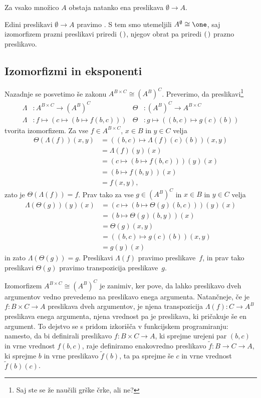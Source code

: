 \begin{trditev}
  Za vsako množico $A$ obstaja natanko ena preslikava $\emptyset \to A$.
\end{trditev}

Edini preslikavi $\emptyset \to A$ pravimo . S tem smo utemeljili
$A^\emptyset \cong \one$, saj izomorfizem prazni preslikavi priredi
$(\,)$, njegov obrat pa priredi $(\,)$ prazno preslikavo.

\subsection{Izomorfizmi in eksponenti}
\label{sec:izomorfizmi-in-eksponenti}

Nazadnje se posvetimo še zakonu $A^{B \times C} \cong (A^B)^C$.
Preverimo, da preslikavi\footnote{Saj ste se že naučili grške črke, ali ne?}
%
\begin{align*}
  \Lambda &: A^{B \times C} \to (A^B)^C
  &
  \Theta &: (A^B)^C \to A^{B \times C}
  \\
  \Lambda &: f \mapsto (c \mapsto (b \mapsto f(b, c)))
  &
  \Theta &: g \mapsto ((b, c) \mapsto g(c)(b))
\end{align*}
%
tvorita izomorfizem. Za vse $f \in A^{B \times C}$, $x \in B$ in $y \in C$ velja
%
\begin{align*}
  \Theta(\Lambda(f))(x, y)
  &= ((b, c) \mapsto \Lambda(f)(c)(b)) (x, y)  \\
  &= \Lambda(f)(y)(x) \\
  &= (c \mapsto (b \mapsto f(b, c)))(y)(x) \\
  &= (b \mapsto f(b, y))(x) \\
  &= f(x, y),
\end{align*}
%
zato je $\Theta(\Lambda(f)) = f$. Prav tako za vse $g \in (A^B)^C$ in $x \in B$ in
$y \in C$ velja
%
\begin{align*}
  \Lambda(\Theta(g))(y)(x)
  &= (c \mapsto (b \mapsto \Theta(g)(b, c)))(y)(x) \\
  &= (b \mapsto \Theta(g)(b, y))(x) \\
  &= \Theta(g)(x, y) \\
  &= ((b, c) \mapsto g(c)(b)) (x, y) \\
  &= g(y)(x)
\end{align*}
%
in zato $\Lambda(\Theta(g)) = g$.
%
Preslikavi $\Lambda(f)$ pravimo  preslikave~$f$, in prav tako preslikavi
$\Theta(g)$ pravimo transpozicija preslikave~$g$.

Izomorfizem $A^{B \times C} \cong (A^B)^C$ je zanimiv, ker pove, da lahko preslikavo dveh
argumentov vedno prevedemo na preslikavo enega argumenta. Natančneje, če je
$f : B \times C \to A$ preslikava dveh argumentov, je njena transpozicija
$\Lambda(f) : C \to A^B$ preslikava enega argumenta, njena vrednost pa je preslikava, ki
pričakuje še en argument. To dejstvo se s pridom izkorišča v funkcijskem programiranju:
namesto, da bi definirali preslikavo $f : B \times C \to A$, ki sprejme urejeni par
$(b, c)$ in vrne vrednost $f(b,c)$, raje definiramo enakovredno preslikavo
$\tilde{f} : B \to C \to A$, ki sprejme $b$ in vrne preslikavo $\tilde{f}(b)$, ta pa
sprejme še $c$ in vrne vrednost $\tilde{f}(b)(c)$.


